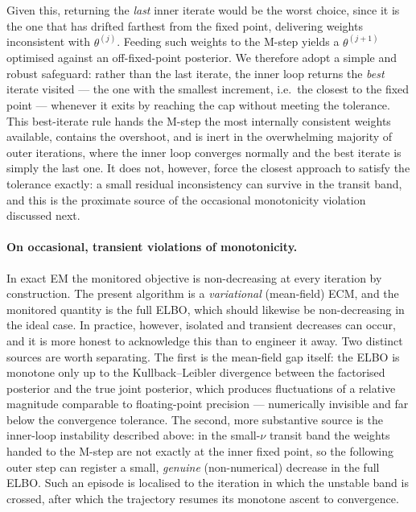 \documentclass[11pt, a4paper, oneside]{article}
\begin{document}
Given this, returning the \emph{last} inner iterate would be the worst
choice, since it is the one that has drifted farthest from the fixed
point, delivering weights inconsistent with $\theta^{(j)}$. Feeding
such weights to the M-step yields a $\theta^{(j+1)}$ optimised against
an off-fixed-point posterior. We therefore adopt a simple and robust
safeguard: rather than the last iterate, the inner loop returns the
\emph{best} iterate visited --- the one with the smallest increment,
i.e.\ the closest to the fixed point --- whenever it exits by reaching
the cap without meeting the tolerance. This best-iterate rule hands
the M-step the most internally consistent weights available, contains
the overshoot, and is inert in the overwhelming majority of outer
iterations, where the inner loop converges normally and the best
iterate is simply the last one. It does not, however, force the
closest approach to satisfy the tolerance exactly: a small residual
inconsistency can survive in the transit band, and this is the
proximate source of the occasional monotonicity violation discussed
next.

\paragraph{On occasional, transient violations of monotonicity.}
In exact EM the monitored objective is non-decreasing at every
iteration by construction. The present algorithm is a
\emph{variational} (mean-field) ECM, and the monitored quantity is the
full ELBO, which should likewise be non-decreasing in the ideal case.
In practice, however, isolated and transient decreases can occur, and
it is more honest to acknowledge this than to engineer it away. Two
distinct sources are worth separating. The first is the mean-field gap
itself: the ELBO is monotone only up to the Kullback--Leibler
divergence between the factorised posterior and the true joint
posterior, which produces fluctuations of a relative magnitude
comparable to floating-point precision --- numerically invisible and
far below the convergence tolerance. The second, more substantive
source is the inner-loop instability described above: in the
small-$\nu$ transit band the weights handed to the M-step are not
exactly at the inner fixed point, so the following outer step can
register a small, \emph{genuine} (non-numerical) decrease in the full
ELBO. Such an episode is localised to the iteration in which the
unstable band is crossed, after which the trajectory resumes its
monotone ascent to convergence.
\end{document}
